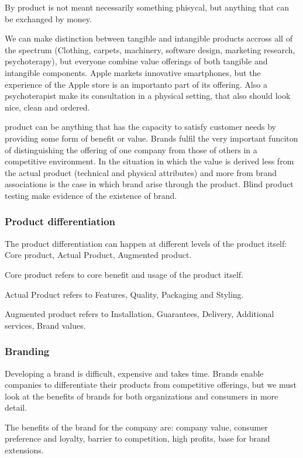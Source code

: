 \documentclass{article}
\begin{document}
By product is not meant necessarily something phisycal, but anything that can be exchanged by money. 

We can make distinction between tangible and intangible products accross all of the spectrum (Clothing, carpets, machinery, software design, marketing research, psychoterapy), but everyone combine value offerings of both tangible and intangible components. Apple markets innovative smartphones, but the experience of the Apple store is an importanto part of its offering. Also a psychoterapist make its consultation in a physical setting, that also should look nice, clean and ordered.

product can be anything that has the capacity to satisfy customer needs by providing some form of benefit or value. Brands fulfil the very important funciton of distinguishing the offering of one company from those of others in a competitive environment. In the situation in which the value is derived less from the actual product (technical and physical attributes) and more from brand associations is the case in which brand arise through the product. Blind product testing make evidence of the existence of brand.

\subsubsection{Product differentiation}
The product differentiation can happen at different levels of the product itself: Core product, Actual Product, Augmented product. 

Core product refers to core benefit and usage of the product itself.

Actual Product refers to Features, Quality, Packaging and Styling.

Augmented product refers to Installation, Guarantees, Delivery, Additional services, Brand values. 

\subsubsection{Branding}
Developing  a brand is difficult, expensive and takes time. Brands enable companies to differentiate their products from competitive offerings, but we must look at the benefits of brands for both organizations and consumers in more detail.

The benefits of the brand for the company are: company value, consumer preference and loyalty, barrier to competition, high profits, base for brand extensions.
\end{document}
